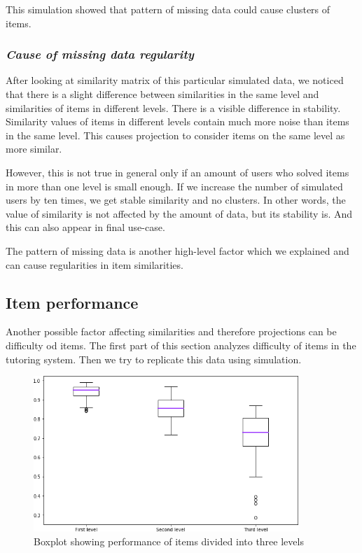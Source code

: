 \documentclass[
  printed, %
  table,   %
  nolof,     %
  nolot,     %
  color,
  final,
  nocover
]{fithesis3}
\begin{document}
This simulation showed that pattern of missing data could cause clusters of items.


\subsubsection{\textit{Cause of missing data regularity}}\label{cause-of-missing-data-regularity}

After looking at similarity matrix of this particular simulated data, we noticed that there is a slight difference between similarities in the same level and similarities of items in different levels. There is a visible difference in stability. Similarity values of items in different levels contain much more noise than items in the same level. This causes projection to consider items on the same level as more similar.

However, this is not true in general only if an amount of users who solved items in more than one level is small enough. If we increase the number of simulated users by ten times, we get stable similarity and no clusters. In other words, the value of similarity is not affected by the amount of data, but its stability is. And this can also appear in final use-case.

The pattern of missing data is another high-level factor which we explained and can cause regularities in item similarities.


\subsection{Item performance}\label{item-performance}

Another possible factor affecting similarities and therefore projections can be difficulty od items. The first part of this section analyzes difficulty of items in the tutoring system. Then we try to replicate this data using simulation.

\begin{figure}
  \includegraphics[width=10cm]{img/items_performance_levels}
  \caption{Boxplot showing performance of items divided into three levels}
  \label{fig:item_performance_levels}
\end{figure}
\end{document}
